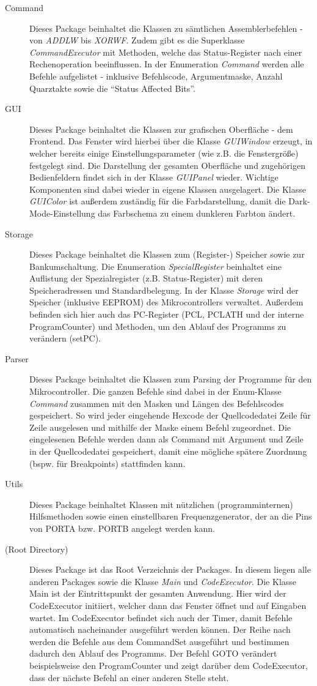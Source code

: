 \begin{description}
\item[Command]{Dieses Package beinhaltet die Klassen zu sämtlichen Assemblerbefehlen - von \textit{ADDLW} bis \textit{XORWF}. Zudem gibt es die Superklasse \textit{CommandExecutor} mit Methoden, welche das Status-Register nach einer Rechenoperation beeinflussen. In der Enumeration \textit{Command} werden alle Befehle aufgelistet - inklusive Befehlscode, Argumentmaske, Anzahl Quarztakte sowie die \enquote{Status Affected Bits}.}
\item[GUI]{Dieses Package beinhaltet die Klassen zur grafischen Oberfläche - dem Frontend. Das Fenster wird hierbei über die Klasse \textit{GUIWindow} erzeugt, in welcher bereits einige Einstellungsparameter (wie z.B. die Fenstergröße) festgelegt sind. Die Darstellung der gesamten Oberfläche und zugehörigen Bedienfeldern findet sich in der Klasse \textit{GUIPanel} wieder. Wichtige Komponenten sind dabei wieder in eigene Klassen ausgelagert. Die Klasse \textit{GUIColor} ist außerdem zuständig für die Farbdarstellung, damit die Dark-Mode-Einstellung das Farbschema zu einem dunkleren Farbton ändert. }
\item[Storage]{Dieses Package beinhaltet die Klassen zum (Register-) Speicher sowie zur Bankumschaltung. Die Enumeration \textit{SpecialRegister} beinhaltet eine Auflistung der Spezialregister (z.B. Status-Register) mit deren Speicheradressen und Standardbelegung. In der Klasse \textit{Storage} wird der Speicher (inklusive EEPROM) des Mikrocontrollers verwaltet.  Außerdem befinden sich hier auch das PC-Register (PCL, PCLATH und der interne ProgramCounter) und Methoden, um den Ablauf des Programms zu verändern (setPC). }
\item[Parser]{Dieses Package beinhaltet die Klassen zum Parsing der Programme für den Mikrocontroller. Die ganzen Befehle sind dabei in der Enum-Klasse \textit{Command} zusammen mit den Masken und Längen des Befehlscodes gespeichert. So wird jeder eingehende Hexcode der Quellcodedatei Zeile für Zeile ausgelesen und mithilfe der Maske einem Befehl zugeordnet. Die eingelesenen Befehle werden dann als Command mit Argument und Zeile in der Quellcodedatei gespeichert, damit eine mögliche spätere Zuordnung (bspw. für Breakpoints) stattfinden kann. }
\item[Utils]{Dieses Package beinhaltet Klassen mit nützlichen (programminternen) Hilfsmethoden sowie einen einstellbaren Frequenzgenerator, der an die Pins von PORTA bzw. PORTB angelegt werden kann.}
\item[(Root Directory)]{Dieses Package ist das Root Verzeichnis der Packages. In diesem liegen alle anderen Packages sowie die Klasse \textit{Main} und \textit{CodeExecutor}. Die Klasse Main ist der Eintrittspunkt der gesamten Anwendung. Hier wird der CodeExecutor initiiert, welcher dann das Fenster öffnet und auf Eingaben wartet. Im CodeExecutor befindet sich auch der Timer, damit Befehle automatisch nacheinander ausgeführt werden können. Der Reihe nach werden die Befehle aus dem CommandSet ausgeführt und bestimmen dadurch den Ablauf des Programms. Der Befehl GOTO verändert beispielsweise den ProgramCounter und zeigt darüber dem CodeExecutor, dass der nächste Befehl an einer anderen Stelle steht. }
\end{description}